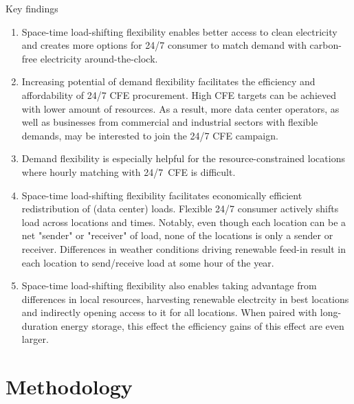 \begin{frame}{Key findings}

  \centering
  {\footnotesize

    \begin{enumerate}
      \item Space-time load-shifting flexibility enables \alert{better access to clean electricity} and creates \alert{more options} for 24/7 consumer to match demand with carbon-free electricity around-the-clock. 

      \item Increasing potential of demand flexibility facilitates the \alert{efficiency and affordability} of 24/7 CFE procurement. High CFE targets can be achieved with lower amount of resources. As a result, more data center operators, as well as businesses from commercial and industrial sectors with flexible demands, may be interested to join the 24/7 CFE campaign.

      \item Demand flexibility is especially \alert{helpful for the resource-constrained locations} where hourly matching with 24/7~CFE is difficult.

      \item Space-time load-shifting flexibility facilitates \alert{economically efficient redistribution of (data center) loads}. Flexible 24/7 consumer actively shifts load across locations and times. Notably, even though each location can be a net "sender" or "receiver" of load, none of the locations is only a sender or receiver. Differences in weather conditions driving renewable feed-in result in each location to send/receive load at some hour of the year.

      \item Space-time load-shifting flexibility also enables taking advantage from differences in local resources, harvesting renewable electrcity in best locations and indirectly \alert{opening access to it for all locations}. When paired with long-duration energy storage, this effect the efficiency gains of this effect are even larger.
  \end{enumerate}
  }
  
\end{frame}



\section{Methodology}



